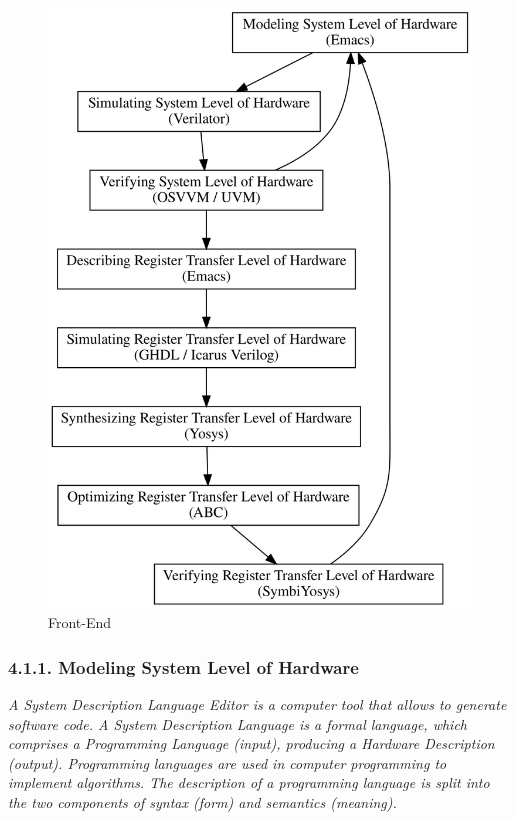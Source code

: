 \documentclass[
]{article}
\begin{document}
\begin{figure}
\centering
\includegraphics{../doc/front-end.svg}
\caption{Front-End}
\end{figure}

\hypertarget{modeling-system-level-of-hardware-1}{%
\subsubsection{4.1.1. Modeling System Level of
Hardware}\label{modeling-system-level-of-hardware-1}}

\emph{A System Description Language Editor is a computer tool that
allows to generate software code. A System Description Language is a
formal language, which comprises a Programming Language (input),
producing a Hardware Description (output). Programming languages are
used in computer programming to implement algorithms. The description of
a programming language is split into the two components of syntax (form)
and semantics (meaning).}
\end{document}
